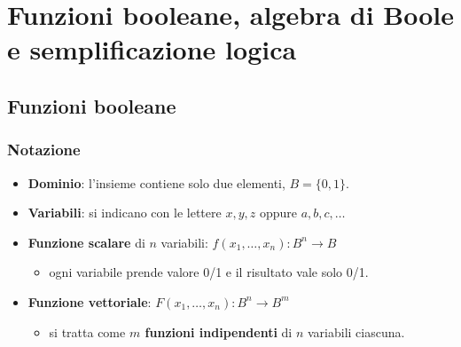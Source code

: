 \documentclass[12pt, a4paper]{article}
\begin{document}
\section{Funzioni booleane, algebra di Boole e semplificazione logica}
\subsection{Funzioni booleane}

\subsubsection{Notazione}
\begin{itemize}
    \item \textbf{Dominio}: l'insieme contiene solo due elementi, $B = \{0, 1\}$.
    \item \textbf{Variabili}: si indicano con le lettere $x, y, z$ oppure $a, b, c, \dots$
    \item \textbf{Funzione scalare} di $n$ variabili: $f(x_1, \dots, x_n) : B^n \to B$
    \begin{itemize}
        \item ogni variabile prende valore 0/1 e il risultato vale solo 0/1.
    \end{itemize}
    \item \textbf{Funzione vettoriale}: $F(x_1, \dots, x_n) : B^n \to B^m$
    \begin{itemize}
        \item si tratta come \textbf{$m$ funzioni indipendenti} di $n$ variabili ciascuna.
    \end{itemize}
\end{itemize}
\end{document}
